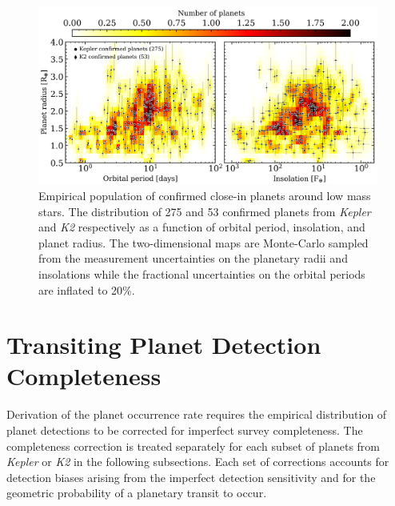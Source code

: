 \documentclass[twocolumn]{emulateapj}
\newcommand{\kepler}[1]{\emph{Kepler}#1}
\newcommand{\ktwo}[1]{\emph{K2}#1}
\begin{document}
\begin{figure}
  \centering
  \includegraphics[width=0.98\hsize]{figures/Ndetmap_Msgt0d0_xbin45_ybin27.png}
  \caption{Empirical population of confirmed close-in planets around low mass stars.
    The distribution of 275 and 53 confirmed planets from \kepler{}
    and \ktwo{} respectively as a function of orbital period, insolation, and planet radius. The two-dimensional maps are
    Monte-Carlo sampled from the measurement uncertainties on the planetary radii and insolations while 
    the fractional uncertainties on the orbital periods are inflated to
    20\%.} %
  \label{fig:Ndet}
\end{figure}





\section{Transiting Planet Detection Completeness}  \label{sect:completeness}
Derivation of the planet occurrence rate requires the empirical distribution of planet detections to be corrected
for imperfect survey completeness. The completeness correction is treated separately for each subset
of planets from \kepler{} or \ktwo{} in the following subsections. Each set of corrections accounts for detection
biases arising from the imperfect detection sensitivity and for the 
geometric probability of a planetary transit to occur.
\end{document}
